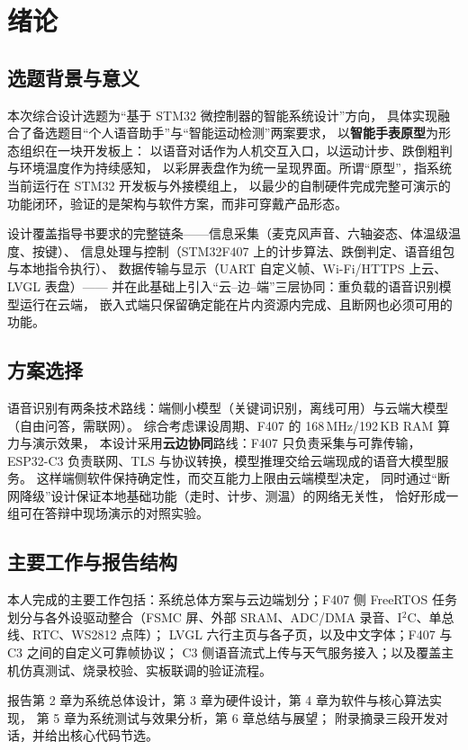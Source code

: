 \section{绪论}

\subsection{选题背景与意义}
本次综合设计选题为``基于 STM32 微控制器的智能系统设计''方向，
具体实现融合了备选题目``个人语音助手''与``智能运动检测''两案要求，
以\textbf{智能手表原型}为形态组织在一块开发板上：
以语音对话作为人机交互入口，以运动计步、跌倒粗判与环境温度作为持续感知，
以彩屏表盘作为统一呈现界面。所谓``原型''，指系统当前运行在 STM32 开发板与外接模组上，
以最少的自制硬件完成完整可演示的功能闭环，验证的是架构与软件方案，而非可穿戴产品形态。

设计覆盖指导书要求的完整链条——信息采集（麦克风声音、六轴姿态、体温级温度、按键）、
信息处理与控制（STM32F407 上的计步算法、跌倒判定、语音组包与本地指令执行）、
数据传输与显示（UART 自定义帧、Wi-Fi/HTTPS 上云、LVGL 表盘）——
并在此基础上引入``云--边--端''三层协同：重负载的语音识别模型运行在云端，
嵌入式端只保留确定能在片内资源内完成、且断网也必须可用的功能。

\subsection{方案选择}
语音识别有两条技术路线：端侧小模型（关键词识别，离线可用）与云端大模型（自由问答，需联网）。
综合考虑课设周期、F407 的 168\,MHz/192\,KB RAM 算力与演示效果，
本设计采用\textbf{云边协同}路线：F407 只负责采集与可靠传输，
ESP32-C3 负责联网、TLS 与协议转换，模型推理交给云端现成的语音大模型服务。
这样端侧软件保持确定性，而交互能力上限由云端模型决定，
同时通过``断网降级''设计保证本地基础功能（走时、计步、测温）的网络无关性，
恰好形成一组可在答辩中现场演示的对照实验。

\subsection{主要工作与报告结构}
本人完成的主要工作包括：系统总体方案与云边端划分；F407 侧 FreeRTOS
任务划分与各外设驱动整合（FSMC 屏、外部 SRAM、ADC/DMA 录音、I$^2$C、单总线、RTC、WS2812 点阵）；
LVGL 六行主页与各子页，以及中文字体；F407 与 C3 之间的自定义可靠帧协议；
C3 侧语音流式上传与天气服务接入；以及覆盖主机仿真测试、烧录校验、实板联调的验证流程。

报告第 2 章为系统总体设计，第 3 章为硬件设计，第 4 章为软件与核心算法实现，
第 5 章为系统测试与效果分析，第 6 章总结与展望；
附录摘录三段开发对话，并给出核心代码节选。
